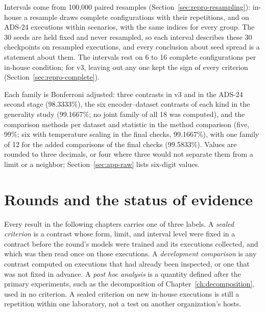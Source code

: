 Intervals come from 100,000 paired resamples
(Section~\ref{sec:repro-resampling}): in-house a resample draws
complete configurations with their repetitions, and on ADS-24
executions within scenarios, with the same indices for every group.
The 30 seeds are held fixed and never resampled, so each interval
describes these 30 checkpoints on resampled executions, and every
conclusion about seed spread is a statement about them. The intervals
rest on 6 to 16 complete configurations per in-house condition; for
v3, leaving out any one kept the sign of every criterion
(Section~\ref{sec:repro-complete}).

Each family is Bonferroni adjusted: three contrasts in v3 and in the
ADS-24 second stage (98.3333\%), the six encoder--dataset contrasts of
each kind in the generality study (99.1667\%; no joint family of all
18 was computed), and the comparison methods per dataset and statistic
in the method comparison (five, 99\%; six with temperature scaling in
the final checks, 99.1667\%), with one family of 12 for the added
comparisons of the final checks (99.5833\%). Values are rounded to
three decimals, or four where three would not separate them from a
limit or a neighbor; Section~\ref{sec:app-raw} lists six-digit
values.

\section{Rounds and the status of evidence}
\label{sec:eval-rounds}

Every result in the following chapters carries one of three labels. A
\emph{sealed criterion} is a contrast whose form, limit, and interval
level were fixed in a contract before the round's models were trained
and its executions collected, and which was then read once on those
executions. A \emph{development comparison} is any contrast computed on
executions that had already been inspected, or one that was not fixed
in advance. A \emph{post hoc analysis} is a quantity defined after the
primary experiments, such as the decomposition of
Chapter~\ref{ch:decomposition}, used in no criterion. A sealed
criterion on new in-house executions is still a repetition within one
laboratory, not a test on another organization's hosts.

